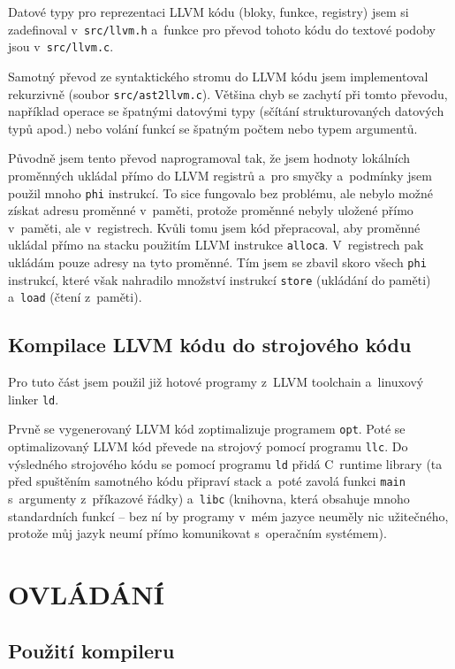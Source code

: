 \documentclass[12pt]{article}
\def\file#1{\texttt{#1}}
\def\code#1{\texttt{#1}}
\begin{document}
Datové typy pro reprezentaci LLVM kódu (bloky, funkce, registry) jsem si zadefinoval v~\file{src/llvm.h} a~funkce pro převod tohoto kódu do textové podoby jsou v~\file{src/llvm.c}.

Samotný převod ze syntaktického stromu do LLVM kódu jsem implementoval rekurzivně (soubor \file{src/ast2llvm.c}).
Většina chyb se zachytí při tomto převodu, například operace se špatnými datovými typy (sčítání strukturovaných datových typů apod.) nebo volání funkcí se špatným počtem nebo typem argumentů.

Původně jsem tento převod naprogramoval tak, že jsem hodnoty lokálních proměnných ukládal přímo do LLVM registrů a~pro smyčky a~podmínky jsem použil mnoho \code{phi} instrukcí.
To sice fungovalo bez problému, ale nebylo možné získat adresu proměnné v~paměti, protože proměnné nebyly uložené přímo v~paměti, ale v~registrech.
Kvůli tomu jsem kód přepracoval, aby proměnné ukládal přímo na stacku použitím LLVM instrukce \code{alloca}. V~registrech pak ukládám pouze adresy na tyto proměnné.
Tím jsem se zbavil skoro všech \code{phi} instrukcí, které však nahradilo množství instrukcí \code{store} (ukládání do paměti) a~\code{load} (čtení z~paměti).

\subsection{Kompilace LLVM kódu do strojového kódu}
Pro tuto část jsem použil již hotové programy z~LLVM toolchain a~linuxový linker \code{ld}.

Prvně se vygenerovaný LLVM kód zoptimalizuje programem \file{opt}. Poté se optimalizovaný LLVM kód převede na strojový pomocí programu \file{llc}.
Do výsledného strojového kódu se pomocí programu \file{ld} přidá C~runtime library (ta před spuštěním samotného kódu připraví stack a~poté zavolá funkci \code{main} s~argumenty z~příkazové řádky)
a~\file{libc} (knihovna, která obsahuje mnoho standardních funkcí -- bez ní by programy v~mém jazyce neuměly nic užitečného, protože můj jazyk neumí přímo komunikovat s~operačním systémem).

\section{OVLÁDÁNÍ}
\subsection{Použití kompileru}\label{sec:usage}
\end{document}
